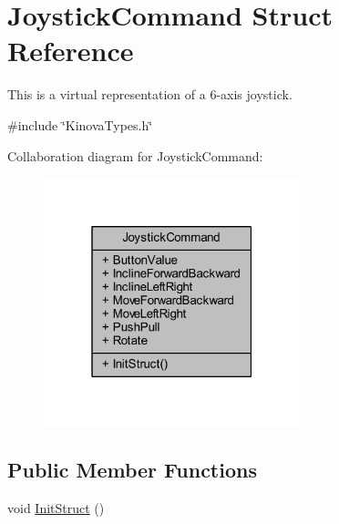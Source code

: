 \hypertarget{structJoystickCommand}{}\section{Joystick\+Command Struct Reference}
\label{structJoystickCommand}


This is a virtual representation of a 6-\/axis joystick.  




{\ttfamily \#include \char`\"{}Kinova\+Types.\+h\char`\"{}}



Collaboration diagram for Joystick\+Command\+:
\nopagebreak
\begin{figure}[H]
\begin{center}
\leavevmode
\includegraphics[width=211pt]{d4/df2/structJoystickCommand__coll__graph}
\end{center}
\end{figure}
\subsection*{Public Member Functions}
\begin{DoxyCompactItemize}
\item 
void \hyperlink{structJoystickCommand_ad3d41f607c6ea6916e061a8edae5a0e4}{Init\+Struct} ()
\end{DoxyCompactItemize}
